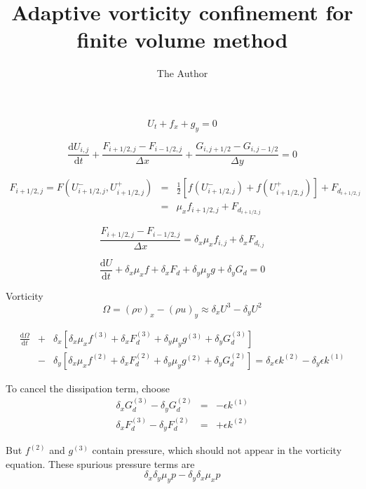 \documentclass[11pt]{amsart}
\title{Adaptive vorticity confinement for finite volume method}
\author{The Author}
\newcommand{\ud}{\textrm{d}}
\newcommand{\dd}[2]{\frac{\ud #1}{\ud #2}}
\begin{document}
\maketitle

\begin{equation*}
U_t + f_x + g_y = 0
\end{equation*}

\begin{equation*}
\dd{U_{i,j}}{t} + \frac{F_{i+1/2,j} - F_{i-1/2,j}}{\Delta x} + \frac{G_{i,j+1/2} - G_{i,j-1/2}}{\Delta y} = 0
\end{equation*}

\begin{eqnarray*}
F_{i+1/2,j} = F(U_{i+1/2,j}^-, U_{i+1/2,j}^+) &=& \frac{1}{2}[ f(U_{i+1/2,j}^-) + f(U_{i+1/2,j}^+)] + F_{d_{i+1/2,j}} \\
&=& \mu_x f_{i+1/2,j} + F_{d_{i+1/2,j}}
\end{eqnarray*}

\begin{equation*}
\frac{F_{i+1/2,j} - F_{i-1/2,j}}{\Delta x} = \delta_x \mu_x f_{i,j} + \delta_x F_{d_{i,j}}
\end{equation*}

\begin{equation*}
\dd{U}{t} + 
\delta_x \mu_x f + \delta_x F_{d} + \delta_y \mu_y g + \delta_y G_d = 0
\end{equation*}

Vorticity
\begin{equation*}
\Omega = (\rho v)_x - (\rho u)_y \approx \delta_x U^3 - \delta_y U^2
\end{equation*}

\begin{eqnarray*}
\dd{\Omega}{t} &+& \delta_x[ \delta_x \mu_x f^{(3)} + \delta_x F^{(3)}_{d} + \delta_y \mu_y g^{(3)} + \delta_y G^{(3)}_d] \\
&-& \delta_y[ \delta_x \mu_x f^{(2)} + \delta_x F^{(2)}_{d} + \delta_y \mu_y g^{(2)} + \delta_y G^{(2)}_d] = \delta_x \epsilon k^{(2)} - \delta_y \epsilon k^{(1)}
\end{eqnarray*}

To cancel the dissipation term, choose
\begin{eqnarray*}
\delta_x G_d^{(3)} - \delta_y G_d^{(2)} &=& -\epsilon k^{(1)} \\
\delta_x F_d^{(3)} - \delta_y F_d^{(2)} &=& +\epsilon k^{(2)}
\end{eqnarray*}

But $f^{(2)}$ and $g^{(3)}$ contain pressure, which should not appear in the vorticity equation. These spurious pressure terms are
\begin{equation*}
\delta_x \delta_y \mu_y p - \delta_y \delta_x \mu_x p
\end{equation*}
\end{document}
